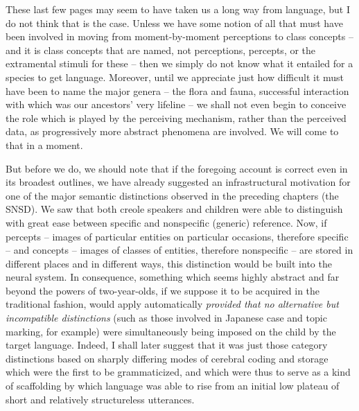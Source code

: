 These last few pages may seem to have taken us a long way from language, but I do not think that is the case. Unless we have some
notion of all that must have been involved in moving from moment-by-moment perceptions to class concepts -- and it is class concepts that are named, not perceptions, percepts, or the extramental stimuli for these -- then we simply do not know what it entailed for a species to get language. Moreover, until we appreciate just how difficult it must have been to name the major genera -- the flora and fauna, successful interaction with which was our ancestors' very lifeline -- we shall not even begin to conceive the role which is played by the perceiving mechanism, rather than the perceived data, as progressively more abstract phenomena are involved. We will come to that in a moment.

But before we do, we should note that if the foregoing account is correct even in its broadest outlines, we have already suggested an infrastructural motivation for one of the major semantic distinctions observed in the preceding chapters (the SNSD). We saw that both creole speakers and children were able to distinguish with great ease between specific and nonspecific (generic) reference. Now, if percepts -- images of particular entities on particular occasions, therefore specific -- and concepts -- images of classes of entities, therefore nonspecific -- are stored in different places and in different ways, this distinction would be built into the neural system. In consequence, something which seems highly abstract and far beyond the powers of two-year-olds, if we suppose it to be acquired in the traditional fashion, would apply automatically \textit{provided that no alternative but incompatible distinctions }(such as those involved in Japanese case and topic marking, for example) were simultaneously being imposed on the child by the target language. Indeed, I shall later suggest that it was just those category distinctions based on sharply differing modes of cerebral coding and storage which were the first to be grammaticized, and which were thus to serve as a kind of scaffolding by which language was able to rise from an initial low plateau of short and relatively structureless utterances.

